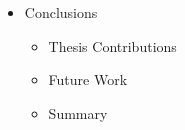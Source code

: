 \begin{itemize}
    \item Conclusions
    \begin{itemize}
        \item Thesis Contributions
        \item Future Work
        \item Summary
    \end{itemize}
    
%
%
%
%

\end{itemize} 